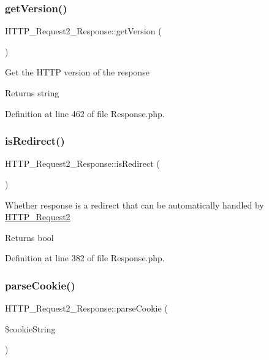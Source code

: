\subsubsection{\texorpdfstring{get\+Version()}{getVersion()}}
{\footnotesize\ttfamily H\+T\+T\+P\+\_\+\+Request2\+\_\+\+Response\+::get\+Version (\begin{DoxyParamCaption}{ }\end{DoxyParamCaption})}

Get the H\+T\+TP version of the response

\begin{DoxyReturn}{Returns}
string 
\end{DoxyReturn}


Definition at line 462 of file Response.\+php.

\mbox{\label{classHTTP__Request2__Response_a9f99e1beb096712a7b1ebda78b638b06}} 
\subsubsection{\texorpdfstring{is\+Redirect()}{isRedirect()}}
{\footnotesize\ttfamily H\+T\+T\+P\+\_\+\+Request2\+\_\+\+Response\+::is\+Redirect (\begin{DoxyParamCaption}{ }\end{DoxyParamCaption})}

Whether response is a redirect that can be automatically handled by \hyperlink{classHTTP__Request2}{H\+T\+T\+P\+\_\+\+Request2}

\begin{DoxyReturn}{Returns}
bool 
\end{DoxyReturn}


Definition at line 382 of file Response.\+php.

\mbox{\label{classHTTP__Request2__Response_a98d67c4a923e69edcfbca9233dd71a81}} 
\subsubsection{\texorpdfstring{parse\+Cookie()}{parseCookie()}}
{\footnotesize\ttfamily H\+T\+T\+P\+\_\+\+Request2\+\_\+\+Response\+::parse\+Cookie (\begin{DoxyParamCaption}\item[{}]{\$cookie\+String }\end{DoxyParamCaption})\hspace{0.3cm}{\ttfamily [protected]}}

